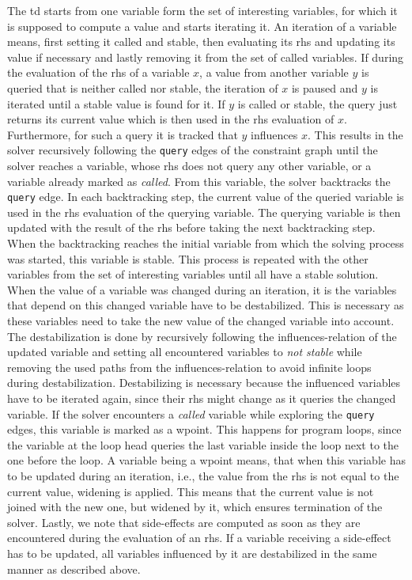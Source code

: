   The \ac{td} starts from one variable form the set of interesting variables, for which it is supposed to compute a value and starts iterating it. An iteration of a variable means, first setting it called and stable, then evaluating its \ac{rhs} and updating its value if necessary and lastly removing it from the set of called variables. If during the evaluation of the \ac{rhs} of a variable $x$, a value from another variable $y$ is queried that is neither called nor stable, the iteration of $x$ is paused and $y$ is iterated until a stable value is found for it. If $y$ is called or stable, the query just returns its current value which is then used in the \ac{rhs} evaluation of $x$. Furthermore, for such a query it is tracked that $y$ influences $x$. This results in the solver recursively following the \texttt{query} edges of the constraint graph until the solver reaches a variable, whose \ac{rhs} does not query any other variable, or a variable already marked as \textit{called}. From this variable, the solver backtracks the \texttt{query} edge. In each backtracking step, the current value of the queried variable is used in the \ac{rhs} evaluation of the querying variable. The querying variable is then updated with the result of the \ac{rhs} before taking the next backtracking step. When the backtracking reaches the initial variable from which the solving process was started, this variable is stable. This process is repeated with the other variables from the set of interesting variables until all have a stable solution.
  When the value of a variable was changed during an iteration, it is the variables that depend on this changed variable have to be destabilized. This is necessary as these variables need to take the new value of the changed variable into account. The destabilization is done by recursively following the influences-relation of the updated variable and setting all encountered variables to \textit{not stable} while removing the used paths from the influences-relation to avoid infinite loops during destabilization. Destabilizing is necessary because the influenced variables have to be iterated again, since their \ac{rhs} might change as it queries the changed variable.
  If the solver encounters a \textit{called} variable while exploring the \texttt{query} edges, this variable is marked as a wpoint. This happens for program loops, since the variable at the loop head queries the last variable inside the loop next to the one before the loop. A variable being a wpoint means, that when this variable has to be updated during an iteration, i.e., the value from the \ac{rhs} is not equal to the current value, widening is applied. This means that the current value is not joined with the new one, but widened by it, which ensures termination of the solver. 
  Lastly, we note that side-effects are computed as soon as they are encountered during the evaluation of an \ac{rhs}. If a variable receiving a side-effect has to be updated, all variables influenced by it are destabilized in the same manner as described above.
  